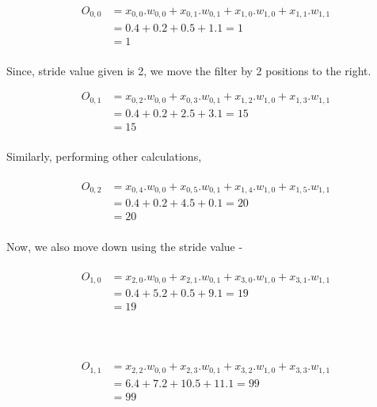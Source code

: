 \begin{equation}
    \begin{split}
        O_{0,0} &= x_{0,0}.w_{0,0} + x_{0,1}.w_{0,1} + x_{1,0}.w_{1,0} + x_{1,1}.w_{1,1}\\
        &= 0.4 + 0.2 + 0.5 + 1.1 = 1\\
        &= 1\\
\end{split}
\end{equation}

Since, stride value given is 2, we move the filter by 2 positions to the right. 

\begin{equation}
    \begin{split}
        O_{0,1} &= x_{0,2}.w_{0,0} + x_{0,3}.w_{0,1} + x_{1,2}.w_{1,0} + x_{1,3}.w_{1,1}\\
        &= 0.4 + 0.2 + 2.5 + 3.1 = 15\\
        &= 15\\
    \end{split}
\end{equation}

Similarly, performing other calculations, 
\\ \\ 
\begin{equation}
    \begin{split}
        O_{0,2} &= x_{0,4}.w_{0,0} + x_{0,5}.w_{0,1} + x_{1,4}.w_{1,0} + x_{1,5}.w_{1,1}\\
        &= 0.4 + 0.2 + 4.5 + 0.1 = 20\\
        &= 20\\
    \end{split}
\end{equation}

Now, we also move down using the stride value - 
\\ \\ 
\begin{equation}
    \begin{split}
        O_{1,0} &= x_{2,0}.w_{0,0} + x_{2,1}.w_{0,1} + x_{3,0}.w_{1,0} + x_{3,1}.w_{1,1}\\
        &= 0.4 + 5.2 + 0.5 + 9.1 = 19\\
        &= 19\\
    \end{split}
\end{equation}

\\ \\
\begin{equation}
    \begin{split}
        O_{1,1} &= x_{2,2}.w_{0,0} + x_{2,3}.w_{0,1} + x_{3,2}.w_{1,0} + x_{3,3}.w_{1,1}\\
        &= 6.4 + 7.2 + 10.5 + 11.1 = 99\\
        &= 99\\
    \end{split}
\end{equation}

